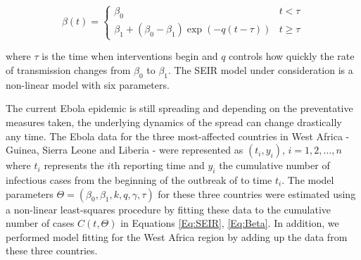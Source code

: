 \documentclass[10pt, journal,onecolumn]{IEEEtran}
\begin{document}
\begin{equation}
\beta(t)=\begin{cases}
\beta_{0} & t<\tau\\
\beta_{1}+(\beta_{0}-\beta_{1})\exp\left(-q\left(t-\tau\right)\right) & t\ge\tau
\end{cases}
\label{Eq:Beta}
\end{equation}

\noindent where $\tau$ is the time when interventions begin and $q$ controls how quickly the rate of
transmission changes from $\beta_0$ to $\beta_1$. The SEIR model under consideration is a non-linear
model with six parameters.

The current Ebola epidemic is still spreading and depending on the preventative measures  taken, the
underlying dynamics of the spread can change drastically any time. The Ebola data for the three
most-affected countries in West Africa - Guinea, Sierra Leone and Liberia - were represented as $(t_i,y_i)$,
$i=1,2,\ldots,n$ where $t_i$ represents the $i$th reporting time and $y_i$ the cumulative number of
infectious cases from the beginning of the outbreak of to time $t_i$.  The model parameters
$\Theta=(\beta_0,\beta_1,k,q,\gamma, \tau)$ for these three countries were estimated using a
non-linear least-squares procedure by fitting these data to the cumulative number of cases
$C(t,\Theta)$ in Equations \eqref{Eq:SEIR}, \eqref{Eq:Beta}. In addition, we performed model fitting
for the West Africa region by adding up the data from these three countries.
\end{document}

